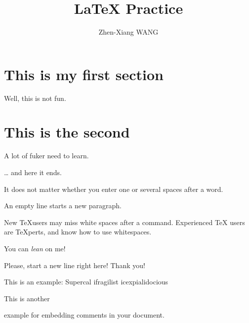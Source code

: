 \documentclass[11pt]{article}
\author{Zhen-Xiang WANG}
\title{\LaTeX{} Practice}
\begin{document}
    \maketitle
    \tableofcontents

    \section{This is my first section}\label{sec:thisIsMyFirstSection}
    Well, this is not fun.
    \section{This is the second}\label{sec:thisIsMySecondSection}
    A lot of fuker need to learn.

    \ldots{} and here it ends.

    It does not matter whether you
    enter one or several spaces
    after a word.

    An empty line starts a new
    paragraph.

    New \TeX users may miss white spaces after a command.
    Experienced \TeX{} users are \TeX perts, and know how to use whitespaces.

    You can \textsl{lean} on me!

    Please, start a new line
    right here!\newline
    Thank you!


    This is an %
    example: Supercal%
    ifragilist%
    icexpialidocious

    This is another
    \begin{comment}
        rather stupid,
        but helpful
    \end{comment}
    example for embedding
    comments in your document.
\end{document}

